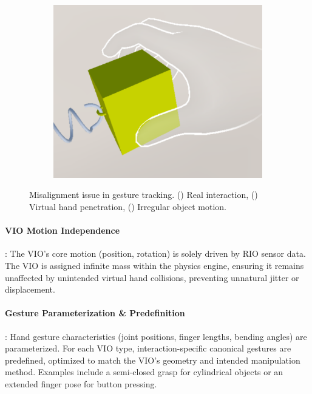 \documentclass[runningheads]{llncs}
\begin{document}
\begin{figure}
\begin{subfigure}{0.31\linewidth}
    \caption{} %
    \label{fig:gesture-tracking-deviations-b}
  \end{subfigure}
  \hfill %
  \begin{subfigure}{0.31\linewidth} %
    \centering
    \includegraphics[width=\linewidth]{image/gesture-tracking-deviations-c.pdf}
    \caption{} %
    \label{fig:gesture-tracking-deviations-c}
  \end{subfigure}
  \caption{Misalignment issue in gesture tracking. () Real interaction, () Virtual hand penetration, () Irregular object motion.}
  \label{fig:gesture-tracking-deviations}
\end{figure}


\paragraph{VIO Motion Independence}: The VIO's core motion (position, rotation) is solely driven by RIO sensor data. The VIO is assigned infinite mass within the physics engine, ensuring it remains unaffected by unintended virtual hand collisions, preventing unnatural jitter or displacement.

\paragraph{Gesture Parameterization \& Predefinition}: Hand gesture characteristics (joint positions, finger lengths, bending angles) are parameterized. For each VIO type, interaction-specific canonical gestures are predefined, optimized to match the VIO's geometry and intended manipulation method. Examples include a semi-closed grasp for cylindrical objects or an extended finger pose for button pressing.
\end{document}
